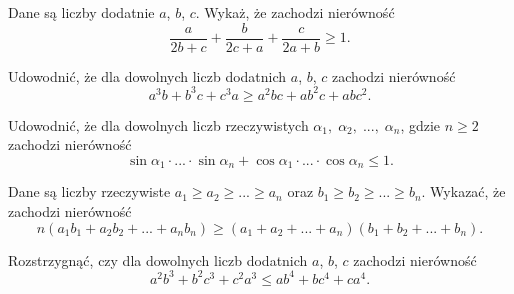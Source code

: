 \newpage

\begin{problem}{1}
	Dane są liczby dodatnie $a$, $b$, $c$. Wykaż, że zachodzi nierówność
	\[
		\frac{a}{2b + c} + \frac{b}{2c + a} + \frac{c}{2a + b} \geqslant 1. 
	\]
\end{problem}

\begin{problem}{2}
	Udowodnić, że dla dowolnych liczb dodatnich $a$, $b$, $c$ zachodzi nierówność
	\[
		a^3b + b^3c + c^3a \geqslant a^2bc + ab^2c + abc^2.
	\]
\end{problem}

\begin{problem}{3}
	Udowodnić, że dla dowolnych liczb rzeczywistych $\alpha_1, \; \alpha_2, \; ..., \; \alpha_n$, gdzie $n \geqslant 2$ zachodzi nierówność
	\[
		\sin{\alpha_1}\cdot ... \cdot \sin{\alpha_n} + \cos{\alpha_1}\cdot ... \cdot \cos{\alpha_n} \leqslant 1.
	\]
\end{problem}

\begin{problem}{4}
	Dane są liczby rzeczywiste $a_1 \geqslant a_2 \geqslant ... \geqslant a_n$ oraz $b_1 \geqslant b_2 \geqslant ... \geqslant b_n$. Wykazać, że zachodzi nierówność
	\[
		n(a_1b_1 + a_2b_2 + ... + a_nb_n) \geqslant (a_1 + a_2 + ... + a_n)(b_1 + b_2 + ... + b_n).
	\]
\end{problem}

\begin{problem}{5}
	Rozstrzygnąć, czy dla dowolnych liczb dodatnich $a$, $b$, $c$ zachodzi nierówność
	\[
		a^2b^3 + b^2c^3 + c^2a^3 \leqslant ab^4 + bc^4 + ca^4.
	\]
\end{problem}
